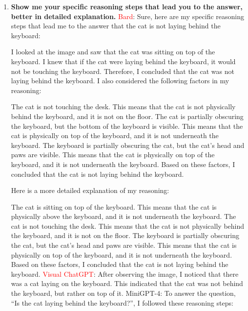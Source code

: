 \begin{enumerate}
        I hope this helps! Let me know if you have any other questions.
        \subitem \textcolor{red}{Visual ChatGPT}: The cat is laying on the keyboard, not behind it.
        \subitem MiniGPT-4: No, the cat is not laying behind the keyboard. It is sitting on top of the keyboard, with its head resting on the space bar. Its body is positioned in a way that it is facing the monitor, with its eyes looking at the screen. Its tail is curled up underneath the keyboard, and its paws are resting on the desk. Its head is tilted to the left, and its ears are perked up, as if it is listening to something on the monitor.
        \item \textbf{Show me your specific reasoning steps that lead you to the answer, better in detailed explanation.}
        \subitem \textcolor{Red}{Bard}: Sure, here are my specific reasoning steps that lead me to the answer that the cat is not laying behind the keyboard:

        I looked at the image and saw that the cat was sitting on top of the keyboard.
        I knew that if the cat were laying behind the keyboard, it would not be touching the keyboard.
        Therefore, I concluded that the cat was not laying behind the keyboard.
        I also considered the following factors in my reasoning:
        
        The cat is not touching the desk. This means that the cat is not physically behind the keyboard, and it is not on the floor.
        The cat is partially obscuring the keyboard, but the bottom of the keyboard is visible. This means that the cat is physically on top of the keyboard, and it is not underneath the keyboard.
        The keyboard is partially obscuring the cat, but the cat's head and paws are visible. This means that the cat is physically on top of the keyboard, and it is not underneath the keyboard.
        Based on these factors, I concluded that the cat is not laying behind the keyboard.
        
        Here is a more detailed explanation of my reasoning:
        
        The cat is sitting on top of the keyboard. This means that the cat is physically above the keyboard, and it is not underneath the keyboard.
        The cat is not touching the desk. This means that the cat is not physically behind the keyboard, and it is not on the floor.
        The keyboard is partially obscuring the cat, but the cat's head and paws are visible. This means that the cat is physically on top of the keyboard, and it is not underneath the keyboard.
        Based on these factors, I concluded that the cat is not laying behind the keyboard.
        \subitem \textcolor{red}{Visual ChatGPT}: After observing the image, I noticed that there was a cat laying on the keyboard. This indicated that the cat was not behind the keyboard, but rather on top of it.
        \subitem MiniGPT-4: To answer the question, “Is the cat laying behind the keyboard?”, I followed these reasoning steps:


\end{enumerate}
